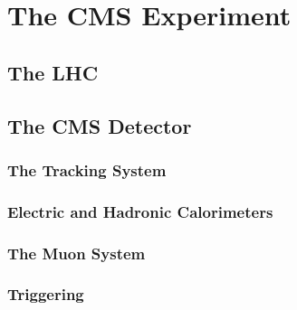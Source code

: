 
\chapter{The CMS Experiment}

\section{The LHC}

\section{The CMS Detector}

\subsection{The Tracking System}

\subsection{Electric and Hadronic Calorimeters}

\subsection{The Muon System}

\subsection{Triggering}


